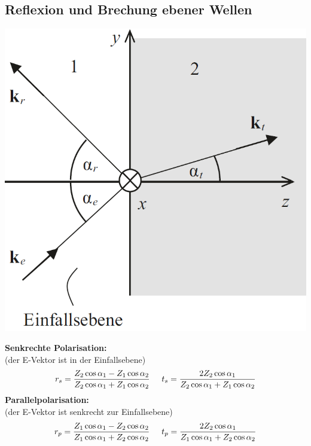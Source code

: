 \documentclass[german]{latex4ei/latex4ei_sheet}
\begin{document}
\subsection{Reflexion und Brechung ebener Wellen}
\includegraphics[width = \columnwidth]{images/einfallswinkel.png}
\begin{sectionbox}
    \textbf{Senkrechte Polarisation:}\\
    (der E-Vektor ist in der Einfallsebene)\\
    \begin{equation*}
        r_s = \frac{Z_2 \cos \alpha_1 - Z_1 \cos \alpha_2}{Z_2 \cos \alpha_1 + Z_1 \cos \alpha_2} \hspace{5mm} t_s = \frac{2 Z_2 \cos \alpha_1}{Z_2 \cos \alpha_1 + Z_1 \cos \alpha_2}
    \end{equation*}	
    \textbf{Parallelpolarisation:}\\
    (der E-Vektor ist senkrecht zur Einfallsebene)\\
    \begin{equation*}
        r_p = \frac{Z_1 \cos \alpha_1 - Z_2 \cos \alpha_2}{Z_1 \cos \alpha_1 + Z_2 \cos \alpha_2} \hspace{5mm} t_p = \frac{2 Z_2 \cos \alpha_1}{Z_1 \cos \alpha_1 + Z_2 \cos \alpha_2} 
    \end{equation*}
\end{sectionbox}
\end{document}
